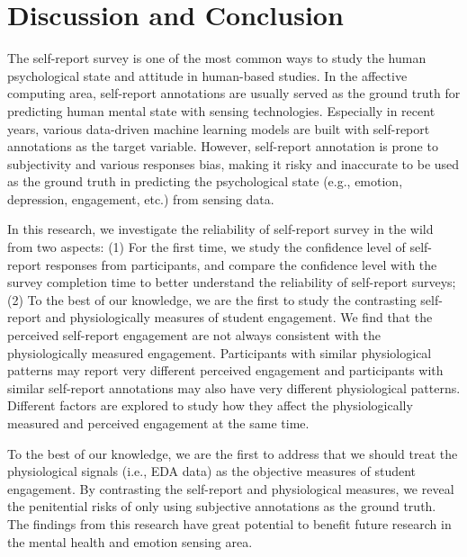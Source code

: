 \documentclass[sigconf]{acmart}
\begin{document}



\section{Discussion and Conclusion}
\label{sec:conclusion}
The self-report survey is one of the most common ways to study the human psychological state and attitude in human-based studies. In the affective computing area, self-report annotations are usually served as the ground truth for predicting human mental state with sensing technologies. Especially in recent years, various data-driven machine learning models are built with self-report annotations as the target variable. However, self-report annotation is prone to  subjectivity and various responses bias, making it risky and inaccurate to be used as the ground truth in predicting the psychological state (e.g., emotion, depression, engagement, etc.) from sensing data.

In this research, we investigate the reliability of self-report survey in the wild from two aspects: (1) For the first time, we study the confidence level of self-report responses from participants, and compare the confidence level with the survey completion time to better understand the reliability of self-report surveys; (2) To the best of our knowledge, we are the first to study the contrasting self-report and physiologically measures of student engagement. We find that the perceived self-report engagement are not always consistent with the physiologically measured engagement. Participants with similar physiological patterns may report very different perceived engagement and participants with similar self-report annotations may also have very different physiological patterns. Different factors are explored to study how they affect the physiologically measured and perceived engagement at the same time.


To the best of our knowledge, we are the first to address that we should treat the physiological signals (i.e., EDA data) as the objective measures of student engagement. By contrasting the self-report and physiological measures, we reveal the penitential risks of only using subjective annotations as the ground truth. The findings from this research have great potential to benefit future research in the mental health and emotion sensing area. 
\end{document}
